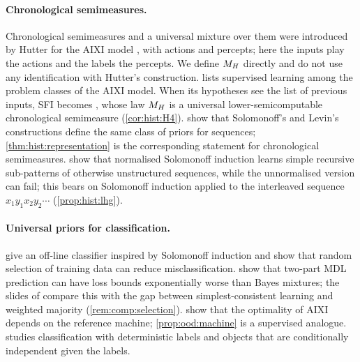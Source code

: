 \paragraph{Chronological semimeasures.}\label{rem:learn:hutterEX}
Chronological semimeasures and a universal mixture over them were introduced by Hutter for the AIXI model \citep{hutter2000theory,hutter2005universal}, with actions and percepts; here the inputs play the actions and the labels the percepts. We define $M_{H}$ directly and do not use any identification with Hutter's construction. \citet{hutter2007aixi} lists supervised learning among the problem classes of the AIXI model. When its hypotheses see the list of previous inputs, SFI becomes \SFIhist{}, whose law $M_{H}$ is a universal lower-semicomputable chronological semimeasure (\cref{cor:hist:H4}). \citet{wood2013non} show that Solomonoff's and Levin's constructions define the same class of priors for sequences; \cref{thm:hist:representation} is the corresponding statement for chronological semimeasures. \citet{lattimore2011universal} show that normalised Solomonoff induction learns simple recursive sub-patterns of otherwise unstructured sequences, while the unnormalised version can fail; this bears on Solomonoff induction applied to the interleaved sequence $x_1y_1x_2y_2\cdots$ (\cref{prop:hist:lhg}).

\paragraph{Universal priors for classification.} \citet{lattimore2013nofree} give an off-line classifier inspired by Solomonoff induction and show that random selection of training data can reduce misclassification. \citet{poland2005asymptotics} show that two-part MDL prediction can have loss bounds exponentially worse than Bayes mixtures; the slides of \citet{vaintrobhanni2026nnbayes} compare this with the gap between simplest-consistent learning and weighted majority (\cref{rem:comp:selection}). \citet{leike2015bad} show that the optimality of AIXI depends on the reference machine; \cref{prop:ood:machine} is a supervised analogue. \citet{ryabko2006pattern} studies classification with deterministic labels and objects that are conditionally independent given the labels.

